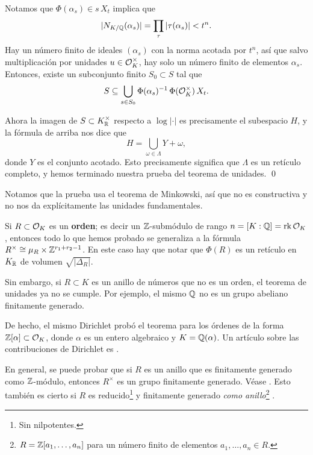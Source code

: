 Notamos que $\Phi (\alpha_s) \in s\,X_t$ implica que
$$|N_{K/\mathbb{Q}} (\alpha_s)| = \prod_\tau |\tau (\alpha_s)| < t^n.$$
Hay un número finito de ideales $(\alpha_s)$ con la norma acotada por $t^n$, así
que salvo multiplicación por unidades $u \in \mathcal{O}_K^\times$, hay solo un número
finito de elementos $\alpha_s$. Entonces, existe un subconjunto finito
$S_0 \subset S$ tal que
$$S \subseteq \bigcup_{s \in S_0} \Phi (\alpha_s)^{-1}\,\Phi (\mathcal{O}_K^\times)\,X_t.$$

Ahora la imagen de $S \subset K_{\mathbb{R}}^\times$ respecto a $\log |\cdot|$ es
precisamente el subespacio $H$, y la fórmula de arriba nos dice que
$$H = \bigcup_{\omega \in \Lambda} Y + \omega,$$
donde $Y$ es el conjunto acotado. Esto precisamente significa que $\Lambda$
es un retículo completo, y hemos terminado nuestra prueba del teorema de
unidades. \qed

\vspace{1em}

Notamos que la prueba usa el teorema de Minkowski, así que no es constructiva
y no nos da explícitamente las unidades fundamentales.

\begin{comentario}
  Si $R \subset \mathcal{O}_K$ es un \textbf{orden}; es decir un $\mathbb{Z}$-submódulo de rango
  $n = [K : \mathbb{Q}] = \operatorname{rk} \mathcal{O}_K$, entonces todo lo que hemos probado se generaliza a
  la fórmula $R^\times \cong \mu_R \times \mathbb{Z}^{r_1 + r_2 - 1}$. En este caso hay
  que notar que $\Phi (R)$ es un retículo en $K_{\mathbb{R}}$ de volumen
  $\sqrt{|\Delta_R|}$.

  Sin embargo, si $R \subset K$ es un anillo de números que no es un orden, el
  teorema de unidades ya no se cumple. Por ejemplo, el mismo $\mathbb{Q}$ no es un
  grupo abeliano finitamente generado.

  De hecho, el mismo Dirichlet probó el teorema para los órdenes de la forma
  $\mathbb{Z} [\alpha] \subset \mathcal{O}_K$, donde $\alpha$ es un entero algebraico y
  $K = \mathbb{Q} (\alpha)$. Un artículo sobre las contribuciones de Dirichlet
  es \cite{Elstrodt-2007}.
\end{comentario}

\begin{comentario}
  En general, se puede probar que si $R$ es un anillo que es finitamente
  generado como $\mathbb{Z}$-módulo, entonces $R^\times$ es un grupo finitamente
  generado. Véase \cite[\S 4.7]{Samuel-TAN}. Esto también es cierto si $R$
  es reducido\footnote{Sin nilpotentes.} y finitamente generado
  \emph{como anillo}\footnote{$R = \mathbb{Z} [a_1,\ldots,a_n]$ para un número finito
    de elementos $a_1,\ldots,a_n \in R$.} \cite{Samuel-1966}.
\end{comentario}


